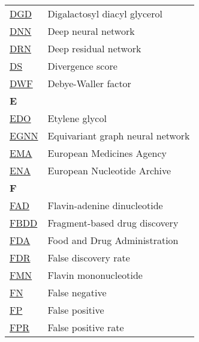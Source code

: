 \begin{longtable}[l]{@{}p{2.5cm}p{12cm}@{}}
\textmd{\href{https://www.ebi.ac.uk/pdbe-srv/pdbechem/chemicalCompound/show/DGD}{DGD}} & Digalactosyl diacyl glycerol \\
\textmd{\href{https://en.wikipedia.org/wiki/Deep_learning\#Deep_neural_networks}{DNN}} & Deep neural network \\
\textmd{\href{https://en.wikipedia.org/wiki/Residual_neural_network}{DRN}} & Deep residual network \\
\textmd{\href{https://onlinelibrary.wiley.com/doi/10.1002/prot.340110408}{DS}} & Divergence score \\
\textmd{\href{https://en.wikipedia.org/wiki/Debye–Waller_factor}{DWF}} & Debye-Waller factor \\[0.3175cm]
\textbf{\large E} & \\[0.25cm]
\textmd{\href{https://www.ebi.ac.uk/pdbe-srv/pdbechem/chemicalCompound/show/EDO}{EDO}} & Etylene glycol \\
\textmd{\href{https://arxiv.org/abs/2404.07194}{EGNN}} & Equivariant graph neural network \\
\textmd{\href{https://en.wikipedia.org/wiki/European_Medicines_Agency}{EMA}} & European Medicines Agency \\
\textmd{\href{https://en.wikipedia.org/wiki/European_Nucleotide_Archive}{ENA}} & European Nucleotide Archive \\[0.3175cm]
\textbf{\large F} & \\[0.25cm]
\textmd{\href{https://www.ebi.ac.uk/pdbe-srv/pdbechem/chemicalCompound/show/FAD}{FAD}} & Flavin-adenine dinucleotide \\
\textmd{\href{https://en.wikipedia.org/wiki/Fragment-based_lead_discovery}{FBDD}} & Fragment-based drug discovery \\
\textmd{\href{https://en.wikipedia.org/wiki/Food_and_Drug_Administration}{FDA}} & Food and Drug Administration \\
\textmd{\href{https://en.wikipedia.org/wiki/False_discovery_rate}{FDR}} & False discovery rate \\
\textmd{\href{https://www.ebi.ac.uk/pdbe-srv/pdbechem/chemicalCompound/show/FMN}{FMN}} & Flavin mononucleotide \\
\textmd{\href{https://en.wikipedia.org/wiki/False_positives_and_false_negatives}{FN}} & False negative \\
\textmd{\href{https://en.wikipedia.org/wiki/False_positives_and_false_negatives}{FP}} & False positive \\
\textmd{\href{https://en.wikipedia.org/wiki/False_positive_rate}{FPR}} & False positive rate \\

\end{longtable}
